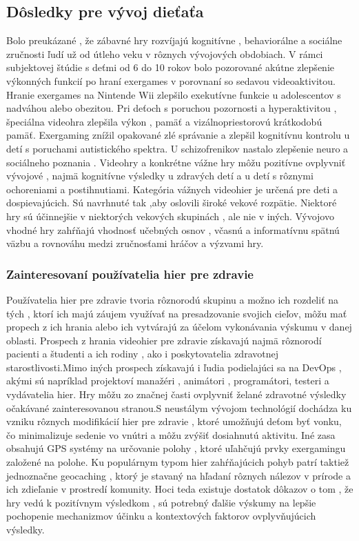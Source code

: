 \documentclass[10pt,oneside,slovak,a4paper]{article}
\begin{document}
\subsection{Dôsledky pre vývoj dieťaťa}
Bolo preukázané , že zábavné hry rozvíjajú kognitívne , behaviorálne a sociálne zručnosti ľudí už od útleho veku v rôznych vývojových obdobiach. \cite{7067095}V rámci subjektovej štúdie s deťmi od 6 do 10 rokov bolo pozorované akútne zlepšenie výkonných funkcií po hraní exergames v porovnaní so sedavou videoaktivitou. Hranie exergames na Nintende Wii zlepšilo exekutívne funkcie u adolescentov s nadváhou alebo obezitou. Pri deťoch s poruchou pozornosti a hyperaktivitou , špeciálna videohra zlepšila výkon , pamäť a vizálnopriestorovú krátkodobú pamäť. Exergaming znížil opakované zlé správanie a zlepšil kognitívnu kontrolu u detí s poruchami autistického spektra. U schizofrenikov nastalo zlepšenie neuro a sociálneho poznania . Videohry a konkrétne vážne hry môžu pozitívne ovplyvniť vývojové , najmä kognitívne výsledky u zdravých detí a u detí s rôznymi ochoreniami a postihnutiami. Kategória vážnych videohier je určená pre deti a dospievajúcich. Sú navrhnuté tak ,aby oslovili široké vekové rozpätie. Niektoré hry sú účinnejšie v niektorých vekových skupinách , ale nie v iných. Vývojovo vhodné hry zahŕňajú vhodnosť učebných osnov , včasnú a informatívnu spätnú väzbu a rovnováhu medzi zručnosťami hráčov a výzvami hry.
\subsubsection{Zainteresovaní používatelia hier pre zdravie}
Používatelia hier pre zdravie tvoria rôznorodú skupinu a možno ich rozdeliť na tých , ktorí ich majú záujem využívať na presadzovanie svojich cieľov, môžu mať propech z ich hrania alebo ich vytvárajú za účelom vykonávania výskumu v danej oblasti. Prospech z hrania videohier pre zdravie získavajú najmä rôznorodí pacienti a študenti a ich rodiny , ako i poskytovatelia zdravotnej starostlivosti.Mimo iných prospech získavajú i ľudia podielajúci sa na DevOps , akými sú napríklad projektoví manažéri , animátori , programátori, testeri a vydávatelia hier. Hry môžu zo značnej časti ovplyvniť želané zdravotné výsledky očakávané zainteresovanou stranou.S neustálym vývojom technológií dochádza ku vzniku rôznych modifikácií hier pre zdravie , ktoré umožňujú deťom byť vonku, čo minimalizuje sedenie vo vnútri a môžu zvýšiť dosiahnutú aktivitu. \cite{6662126} Iné zasa obsahujú GPS systémy na určovanie polohy , ktoré uľahčujú prvky exergamingu založené na polohe. Ku populárnym typom hier zahŕňajúcich pohyb patrí taktiež jednoznačne geocaching , ktorý je stavaný na hľadaní rôznych nálezov v prírode a ich zdieľanie v prostredí komunity. Hoci teda existuje dostatok dôkazov o tom , že hry vedú k pozitívnym výsledkom , sú potrebný ďalšie výskumy na lepšie pochopenie mechanizmov účinku a kontextových faktorov ovplyvňujúcich výsledky.
\end{document}
